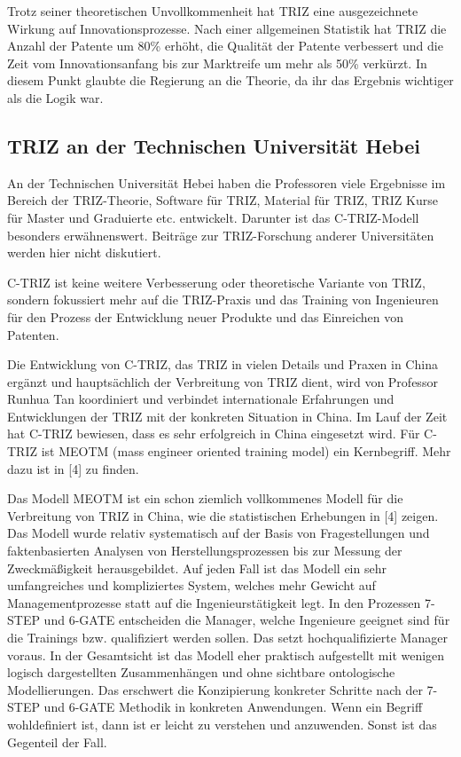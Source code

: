 \documentclass[11pt,a4paper]{article}
\begin{document}
Trotz seiner theoretischen Unvollkommenheit hat TRIZ eine ausgezeichnete
Wirkung auf Innovationsprozesse. Nach einer allgemeinen Statistik hat TRIZ die
Anzahl der Patente um 80\% erhöht, die Qualität der Patente verbessert und die
Zeit vom Innovationsanfang bis zur Marktreife um mehr als 50\% verkürzt. In
diesem Punkt glaubte die Regierung an die Theorie, da ihr das Ergebnis
wichtiger als die Logik war.

\subsection{TRIZ an der Technischen Universität Hebei}

An der Technischen Universität Hebei haben die Professoren viele Ergebnisse im
Bereich der TRIZ-Theorie, Software für TRIZ, Material für TRIZ, TRIZ Kurse für
Master und Graduierte etc. entwickelt. Darunter ist das C-TRIZ-Modell
besonders erwähnenswert. Beiträge zur TRIZ-Forschung anderer Universitäten
werden hier nicht diskutiert.

C-TRIZ ist keine weitere Verbesserung oder theoretische Variante von TRIZ,
sondern fokussiert mehr auf die TRIZ-Praxis und das Training von Ingenieuren
für den Prozess der Entwicklung neuer Produkte und das Einreichen von
Patenten.

Die Entwicklung von C-TRIZ, das TRIZ in vielen Details und Praxen in China
ergänzt und hauptsächlich der Verbreitung von TRIZ dient, wird von Professor
Runhua Tan koordiniert und verbindet internationale Erfahrungen und
Entwicklungen der TRIZ mit der konkreten Situation in China. Im Lauf der Zeit
hat C-TRIZ bewiesen, dass es sehr erfolgreich in China eingesetzt wird. Für
C-TRIZ ist MEOTM (mass engineer oriented training model) ein Kernbegriff.
Mehr dazu ist in [4] zu finden.

Das Modell MEOTM ist ein schon ziemlich vollkommenes Modell für die
Verbreitung von TRIZ in China, wie die statistischen Erhebungen in [4] zeigen.
Das Modell wurde relativ systematisch auf der Basis von Fragestellungen und
faktenbasierten Analysen von Herstellungsprozessen bis zur Messung der
Zweckmäßigkeit herausgebildet. Auf jeden Fall ist das Modell ein sehr
umfangreiches und kompliziertes System, welches mehr Gewicht auf
Managementprozesse statt auf die Ingenieurstätigkeit legt. In den Prozessen
7-STEP und 6-GATE entscheiden die Manager, welche Ingenieure geeignet sind für
die Trainings bzw. qualifiziert werden sollen. Das setzt hochqualifizierte
Manager voraus.  In der Gesamtsicht ist das Modell eher praktisch aufgestellt
mit wenigen logisch dargestellten Zusammenhängen und ohne sichtbare
ontologische Modellierungen.  Das erschwert die Konzipierung konkreter
Schritte nach der 7-STEP und 6-GATE Methodik in konkreten Anwendungen. Wenn
ein Begriff wohldefiniert ist, dann ist er leicht zu verstehen und
anzuwenden. Sonst ist das Gegenteil der Fall.
\end{document}
